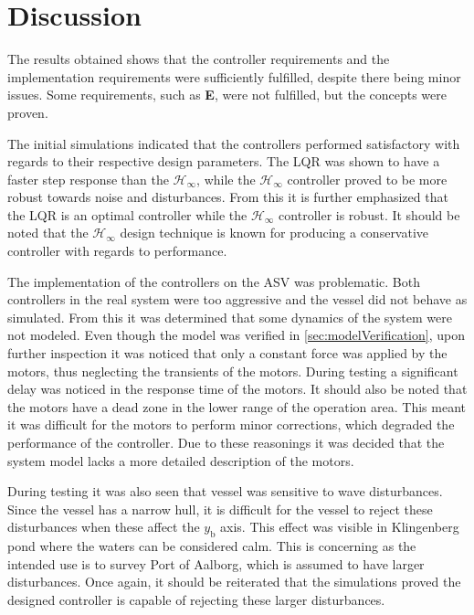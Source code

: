 \chapter{Discussion}\label{chap:discussion}
The results obtained shows that the controller requirements and the implementation requirements were sufficiently fulfilled, despite there being minor issues. Some requirements, such as \textbf{E}, were not fulfilled, but the concepts were proven.

The initial simulations indicated that the controllers performed satisfactory with regards to their respective design parameters. The LQR was shown to have a faster step response than the $\mathcal{H}_\infty$, while the $\mathcal{H}_\infty$ controller proved to be more robust towards noise and disturbances. From this it is further emphasized that the LQR is an optimal controller while the $\mathcal{H}_\infty$ controller is robust. It should be noted that the $\mathcal{H}_\infty$ design technique is known for producing a conservative controller with regards to performance.

The implementation of the controllers on the ASV was problematic. Both controllers in the real system were too aggressive and the vessel did not behave as simulated. From this it was determined that some dynamics of the system were not modeled. Even though the model was verified in \autoref{sec:modelVerification}, upon further inspection it was noticed that only a constant force was applied by the motors, thus neglecting the transients of the motors. During testing a significant delay was noticed in the response time of the motors. It should also be noted that the motors have a dead zone in the lower range of the operation area. This meant it was difficult for the motors to perform minor corrections, which degraded the performance of the controller. Due to these reasonings it was decided that the system model lacks a more detailed description of the motors.

During testing it was also seen that vessel was sensitive to wave disturbances. Since the vessel has a narrow hull, it is difficult for the vessel to reject these disturbances when these affect the $y_\mathrm{b}$ axis. This effect was visible in Klingenberg pond where the waters can be considered calm. This is concerning as the intended use is to survey Port of Aalborg, which is assumed to have larger disturbances. Once again, it should be reiterated that the simulations proved the designed controller is capable of rejecting these larger disturbances.

